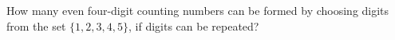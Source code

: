 How many even four-digit counting numbers can be formed by choosing digits from the set $\{1,2,3,4,5\}$, if digits can be repeated?
